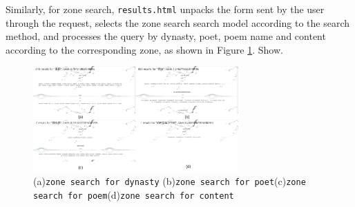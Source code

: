 Similarly, for zone search, \lstinline{results.html} unpacks the form sent by the user through the request, selects the zone search search model according to the search method, and processes the query by dynasty, poet, poem name and content according to the corresponding zone, as shown in Figure \ref{search-10}. Show.

\begin{figure}[h]
\centering
\includegraphics[width=0.7\textwidth]{figure/result2.png}
\caption{(a)\lstinline{zone search for dynasty} (b)\lstinline{zone search for poet}(c)\lstinline{zone search for poem}(d)\lstinline{zone search for content}}
\label{search-10}
\end{figure}